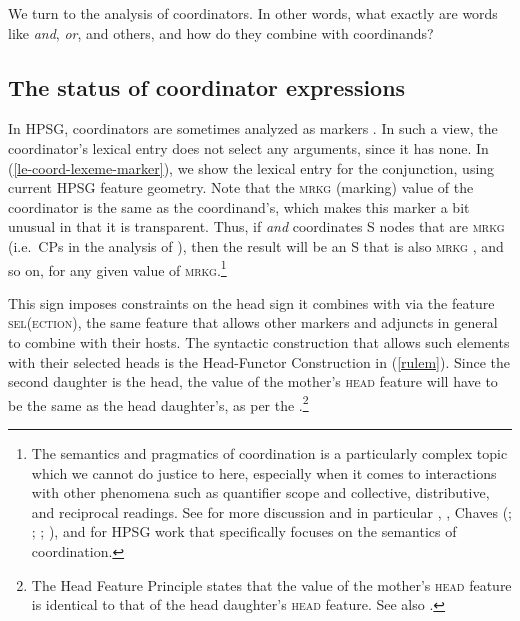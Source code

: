 We turn to  the  analysis of coordinators. 
In other words, what exactly are words like \emph{and}, \emph{or}, 
and others, and how do they combine with coordinands?

\subsection{The status of coordinator expressions}

\largerpage
In HPSG, coordinators are sometimes analyzed as markers
\parencites[Section~4.1]{Beavers}[Section~4.1]{Drellishak:Bender:05}. In such a view, the
coordinator's lexical entry does not select any arguments, since it has none. In
(\ref{le-coord-lexeme-marker}), we show the lexical entry for the conjunction, using current HPSG
feature geometry. Note that the \textsc{mrkg} (marking) value of the coordinator is the same as the
coordinand's, which makes this marker a bit unusual in that it is transparent. Thus, if \emph{and}
coordinates S nodes that are \textsc{mrkg}  (i.e.\ CPs in the analysis of
  \citealt[Section~1.6]{ps2}), then the result will be an S that is also \textsc{mrkg} ,
and so on, for any given value of \textsc{mrkg}.\footnote{The semantics and pragmatics of
  coordination  is a particularly complex topic which we cannot do justice to here, especially when
  it comes to interactions with other phenomena such as quantifier scope and collective,
  distributive, and reciprocal readings. See  for more discussion and in
  particular \citet[Section~6.7]{mrs},  \citet{jfast}, Chaves
  (\citeyear[Chapters~4--6]{chavesthesis}; \citeyear[Section~5.3]{chavesextr};
  \citeyear{chavessubjexp}; \citeyear{Chaves:09}), and \citet[Chapters~4--5]{sangheepark} for HPSG
  work that specifically focuses on the semantics of coordination.} 

\ea
{}\label{le-coord-lexeme-marker}
\z




\noindent
This sign imposes constraints on the head sign it combines with via the feature \textsc{sel}(\textsc{ection}), the same feature that allows other markers and 
adjuncts in general to combine with their
hosts. The syntactic construction that allows such elements with their selected heads is the Head-Functor Construction in (\ref{rulem}).
Since the second daughter is the head, the value of the mother's \textsc{head} feature will have to be the same as the head daughter's, as per the
.\footnote{The Head Feature Principle \citep[]{pollardsag} states that the value of
the mother's \textsc{head} feature is identical to that of the head daughter's \textsc{head}
feature. See also \crossrefchaptert[\page \pageref{page-hfp}]{properties}.}

